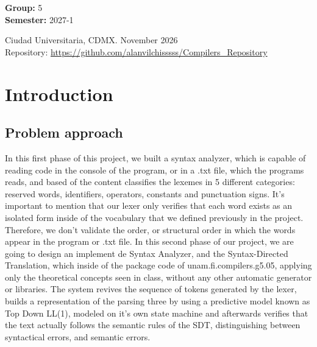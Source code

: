 \documentclass[letterpaper,12pt,oneside]{article}
\begin{document}
\begin{titlepage}
\begin{center}
\begin{center}
            \bigskip
            
            \textbf{Group:} 5 \\
            \textbf{Semester:} 2027-1
        \end{center}
        
        \vfill
        
        \begin{center}
            {Ciudad Universitaria, CDMX. November 2026}\\
            {\footnotesize Repository: \url{https://github.com/alanvilchisssss/Compilers_Repository}}
        \end{center}
        \cleardoublepage
    \end{center}
\end{titlepage}

\tableofcontents
\clearpage

\section{Introduction}

\subsection{Problem approach}
In this first phase of this project, we built a syntax analyzer, which is capable of reading code in the console of the program, or in a .txt file, which the programs reads, and based of the content classifies the lexemes in 5 different categories: reserved words, identifiers, operators, constants and punctuation signs. It's important to mention that our lexer only verifies that each word exists as an isolated form inside of the vocabulary that we defined previously in the project. Therefore, we don't validate the order, or structural order in which the words appear in the program or .txt file. 
In this second phase of our project, we are going to design an implement de Syntax Analyzer, and the Syntax-Directed Translation, which inside of the package code of unam.fi.compilers.g5.05, applying only the theoretical concepts seen in class, without any other automatic generator or libraries. The system revives the sequence of tokens generated by the lexer, builds a representation of the parsing three by using a predictive model known as Top Down LL(1), modeled on it's own state machine and afterwards verifies that the text actually follows the semantic rules of the SDT, distinguishing between syntactical errors, and semantic errors.
\end{document}
